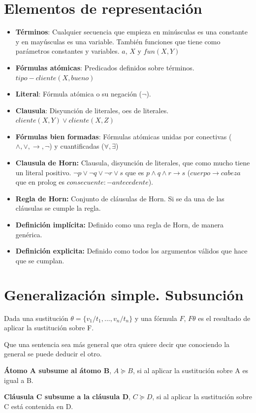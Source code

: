 \documentclass[12pt, twoside, openright]{report} %
\begin{document}
\section{Elementos de representación}
\begin{itemize}
	\item \textbf{Términos}: Cualquier secuencia que empieza en minúsculas es una constante y en mayúsculas es una variable. También funciones que tiene como parámetros constantes y variables. $a$, $X$ y $fun(X,Y)$
	\item \textbf{Fórmulas atómicas}: Predicados definidos sobre términos. $tipo-cliente(X, bueno)$
	\item \textbf{Literal}: Fórmula atómica o su negación ($\neg$).
	\item \textbf{Clausula}: Disyunción de literales, oes de literales. $cliente(X,Y)\vee cliente(X,Z)$
	\item \textbf{Fórmulas bien formadas}: Fórmulas atómicas unidas por conectivas ($\wedge, \vee, \rightarrow, \neg$) y cuantificadas ($\forall, \exists$)
	\item \textbf{Clausula de Horn:} Clausula, disyunción de literales, que como mucho tiene un literal positivo. $\neg p \vee \neg q \vee \neg r \vee s$ que es $p \wedge q \wedge r \rightarrow s$ ($cuerpo \rightarrow cabeza$ que en prolog es $consecuente:-antecedente$).
	\item \textbf{Regla de Horn:} Conjunto de cláusulas de Horn. Si se da una de las cláusulas se cumple la regla.
	\item \textbf{Definición implícita:} Definido como una regla de Horn, de manera genérica.
	\item \textbf{Definición explicita:} Definido como todos los argumentos válidos que hace que se cumplan.
\end{itemize}

\section{Generalización simple. Subsunción}
Dada una sustitución $\theta= \{v_1/t_1, . . . , v_n/t_n\}$ y una fórmula $F$, $F\theta$ es el resultado de aplicar la sustitución sobre F.

Que una sentencia sea más general que otra quiere decir que conociendo la general se puede deducir el otro.

\textbf{Átomo A subsume al átomo B}, $A \succeq B$, si al aplicar la sustitución sobre A es igual a B.

\textbf{Cláusula C subsume a la cláusula D}, $C \succeq D$, si al aplicar la sustitución sobre C está contenida en D.
\end{document}
